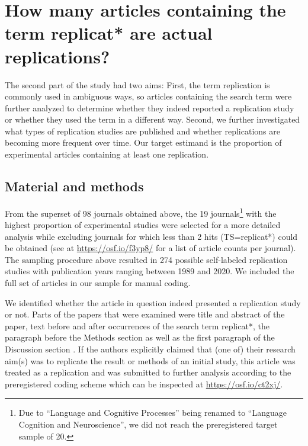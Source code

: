 \documentclass[cm,linguex]{glossa}
\begin{document}
\hypertarget{how-many-articles-containing-the-term-replicat-are-actual-replications}{%
\section{How many articles containing the term replicat* are actual replications?}\label{how-many-articles-containing-the-term-replicat-are-actual-replications}}

The second part of the study had two aims: First, the term replication is commonly used in ambiguous ways, so articles containing the search term were further analyzed to determine whether they indeed reported a replication study or whether they used the term in a different way.
Second, we further investigated what types of replication studies are published and whether replications are becoming more frequent over time. Our target estimand is the proportion of experimental articles containing at least one replication.

\hypertarget{material-and-methods-1}{%
\subsection{Material and methods}\label{material-and-methods-1}}

From the superset of 98 journals obtained above, the 19 journals\footnote{Due to ``Language and Cognitive Processes'' being renamed to ``Language Cognition and Neuroscience'', we did not reach the preregistered target sample of 20.} with the highest proportion of experimental studies were selected for a more detailed analysis while excluding journals for which less than 2 hits (TS=replicat*) could be obtained (see at \url{https://osf.io/f3yp8/} for a list of article counts per journal).
The sampling procedure above resulted in 274 possible self-labeled replication studies with publication years ranging between 1989 and 2020. We included the full set of articles in our sample for manual coding.

We identified whether the article in question indeed presented a replication study or not.
Parts of the papers that were examined were title and abstract of the paper, text before and after occurrences of the search term replicat*, the paragraph before the Methods section as well as the first paragraph of the Discussion section \citep[following and adapting the procedure specified by][]{makel_replication_2016}.
If the authors explicitly claimed that (one of) their research aim(s) was to replicate the result or methods of an initial study, this article was treated as a replication and was submitted to further analysis according to the preregistered coding scheme which can be inspected at \url{https://osf.io/ct2xj/}.
\end{document}
